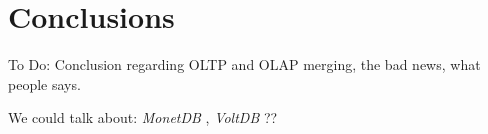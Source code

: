 \documentclass[12pt]{article} %
\begin{document}
\section{Conclusions} 

To Do: Conclusion regarding OLTP and OLAP merging, the bad news, what people says.

We could talk about: \emph{ MonetDB }, \emph{ VoltDB }??





\end{document}

